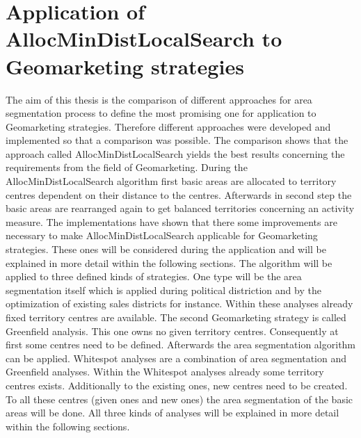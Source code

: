 \section{Application of AllocMinDistLocalSearch to Geomarketing strategies}
The aim of this thesis is the comparison of different approaches for area segmentation process to define the most promising one for application to Geomarketing strategies. Therefore different approaches were developed and implemented so that a comparison was possible. The comparison shows that the approach called AllocMinDistLocalSearch yields the best results concerning the requirements from the field of Geomarketing. During the AllocMinDistLocalSearch algorithm first basic areas are allocated to territory centres dependent on their distance to the centres. Afterwards in second step the basic areas are rearranged again to get balanced territories concerning an activity measure. The implementations have shown that there some improvements are necessary to make AllocMinDistLocalSearch applicable for Geomarketing strategies. These ones will be considered during the application and will be explained in more detail within the following sections. The algorithm will be applied to three defined kinds of strategies. One type will be the area segmentation itself which is applied during political distriction and by the optimization of existing sales districts for instance. Within these analyses already fixed territory centres are available. The second Geomarketing strategy is called Greenfield analysis. This one owns no given territory centres. Consequently at first some centres need to be defined. Afterwards the area segmentation algorithm can be applied. Whitespot analyses are a combination of area segmentation and Greenfield analyses. Within the Whitespot analyses already some territory centres exists. Additionally to the existing ones, new centres need to be created. To all these centres (given ones and new ones) the area segmentation of the basic areas will be done. All three kinds of analyses will be explained in more detail within the following sections. 


